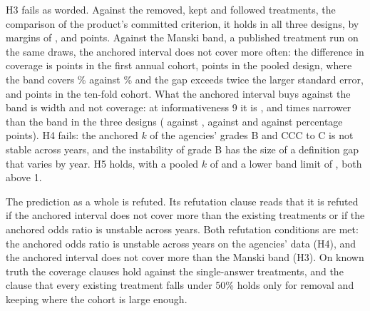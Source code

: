 H3 fails as worded. Against the removed, kept and followed treatments, the comparison of the product's committed criterion, it holds in all three designs, by margins of ,  and  points. Against the Manski band, a published treatment run on the same draws, the anchored interval does not cover more often: the difference in coverage is  points in the first annual cohort,  points in the pooled design, where the band covers \% against \% and the gap exceeds twice the larger standard error, and  points in the ten-fold cohort. What the anchored interval buys against the band is width and not coverage: at informativeness 9 it is ,  and  times narrower than the band in the three designs ( against ,  against  and  against  percentage points). H4 fails: the anchored $k$ of the agencies' grades B and CCC to C is not stable across years, and the instability of grade B has the size of a definition gap that varies by year. H5 holds, with a pooled $k$ of  and a lower band limit of , both above 1.

The prediction as a whole is refuted. Its refutation clause reads that it is refuted if the anchored interval does not cover more than the existing treatments or if the anchored odds ratio is unstable across years. Both refutation conditions are met: the anchored odds ratio is unstable across years on the agencies' data (H4), and the anchored interval does not cover more than the Manski band (H3). On known truth the coverage clauses hold against the single-answer treatments, and the clause that every existing treatment falls under 50\% holds only for removal and keeping where the cohort is large enough.


